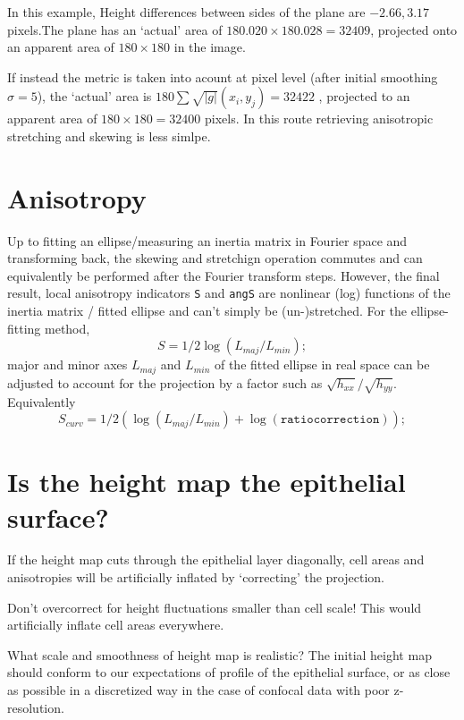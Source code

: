 \documentclass[10pt,a4paper]{article}
\begin{document}
In this example, Height differences between sides of the plane are $-2.66, 3.17$ pixels.The plane has an `actual' area of $180.020 \times 180.028 = 32409 $, projected onto an apparent area of $180 \times 180$  in the image.

If instead the metric is taken into acount at pixel level (after initial smoothing $\sigma =5$), the `actual' area is $180 \sum \sqrt{|g|}(x_i, y_j) =32422 $ , projected to an apparent area of $180 \times 180 = 32400$ pixels.  In this route retrieving anisotropic stretching and skewing is less simlpe.
\section{Anisotropy}
Up to fitting an ellipse/measuring an inertia matrix in Fourier space and transforming back, the skewing and stretchign operation commutes and can equivalently be performed after the Fourier transform steps.  However, the final result, local anisotropy indicators \texttt{S} and \texttt{angS} are nonlinear (log) functions of the inertia matrix / fitted ellipse and can't simply be (un-)stretched.  For the ellipse-fitting method, 
\begin{equation}
S = 1/2 \log(L_{maj}/L_{min});
\end{equation}
major and minor axes $L_{maj}$ and $L_{min}$ of the fitted ellipse in real space can be adjusted to account for the projection by a factor such as $\sqrt{h_{xx}}/\sqrt{h_{yy}}$.  Equivalently 
\begin{equation}
S_{curv} = 1/2 \left( \log(L_{maj}/L_{min}) + \log(\mathtt{ratiocorrection}) \right);
\end{equation}
\section{Is the height map the epithelial surface?}
If the height map cuts through the epithelial layer diagonally, cell areas and anisotropies will be artificially inflated by `correcting' the projection.

Don't overcorrect for height fluctuations smaller than cell scale!  This would artificially inflate cell areas everywhere.

What scale and smoothness of height map is realistic?  The initial height map should conform to our expectations of profile of the epithelial surface, or as close as possible in a discretized way in the case of confocal data with poor z-resolution.
\end{document}
